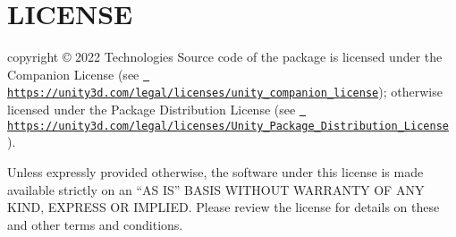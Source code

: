 \chapter{LICENSE}
\hypertarget{md__hey_tea_9_2_library_2_package_cache_2com_8unity_8burst_0d1_88_87_2_l_i_c_e_n_s_e}{}\label{md__hey_tea_9_2_library_2_package_cache_2com_8unity_8burst_0d1_88_87_2_l_i_c_e_n_s_e}
 copyright © 2022  Technologies Source code of the package is licensed under the  Companion License (see \href{https://unity3d.com/legal/licenses/unity_companion_license}{\texttt{ https\+://unity3d.\+com/legal/licenses/unity\+\_\+companion\+\_\+license}}); otherwise licensed under the  Package Distribution License (see \href{https://unity3d.com/legal/licenses/Unity_Package_Distribution_License}{\texttt{ https\+://unity3d.\+com/legal/licenses/\+Unity\+\_\+\+Package\+\_\+\+Distribution\+\_\+\+License}} ).

Unless expressly provided otherwise, the software under this license is made available strictly on an “\+AS IS” BASIS WITHOUT WARRANTY OF ANY KIND, EXPRESS OR IMPLIED. Please review the license for details on these and other terms and conditions. 